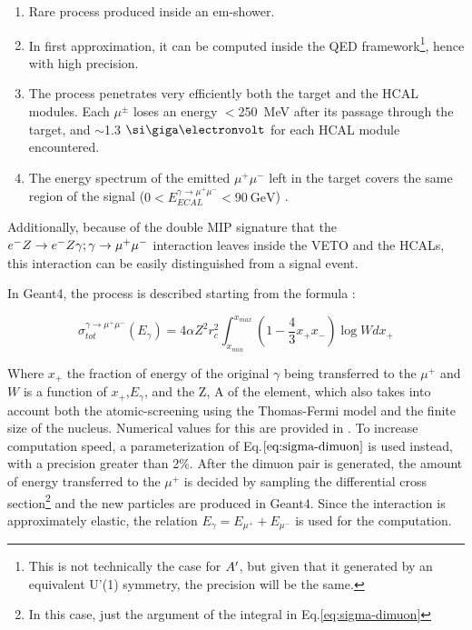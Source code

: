 \begin{enumerate}
\item Rare process produced inside an em-shower.
\item In first approximation, it can be computed inside the QED framework\footnote{This is not technically the case for $A'$, but given that it generated by an equivalent U'(1) symmetry, the precision will be the same.}, hence with high precision.
\item The process penetrates very efficiently both the target and the HCAL modules. Each $\mu^{\pm}$ loses an energy $<$\SI{250}{\mega\electronvolt} after its passage through the target, and $\sim$1.3 $\gev$ for each HCAL module encountered. 
\item The energy spectrum of the emitted $\mu^+\mu^-$ left in the target covers the same region of the signal ($0 < E_{ECAL}^{\gamma \to \mu^+ \mu^-} < \SI{90}{\giga\electronvolt}$) \cite{dimuon-mc}.
\end{enumerate}

Additionally, because of the double MIP signature that the $e^- Z \to e^- Z \gamma; \gamma \to \mu^+ \mu^-$ interaction leaves inside the VETO and the HCALs, this interaction can be easily distinguished from a signal event. 

In Geant4, the process is described starting from the formula \cite{dimuon-mc}:

\begin{equation}
  \label{eq:sigma-dimuon}
  \sigma_{tot}^{\gamma \to \mu^+ \mu^-}(E_{\gamma}) = 4\alpha Z^2 r^2_c\int^{x_{max}}_{x_{min}} \left(1 - \frac{4}{3}x_+x_- \right) \log{W}dx_+
\end{equation}

Where $x_+$ the fraction of energy of the original $\gamma$ being transferred to the $\mu^+$ and $W$ is a function of $x_+$,$E_{\gamma}$, and the Z, A of the element, which also takes into account both the atomic-screening using the Thomas-Fermi model and the finite size of the nucleus. Numerical values for this are provided in \cite{dimuon-mc}. To increase computation speed, a parameterization of Eq.$\ref{eq:sigma-dimuon}$ is used instead, with a precision greater than 2\%. After the dimuon pair is generated, the amount of energy transferred to the $\mu^+$ is decided by sampling the differential cross section\footnote{In this case, just the argument of the integral in Eq.\ref{eq:sigma-dimuon}} and the new particles are produced in Geant4. Since the interaction is approximately elastic, the relation $E_{\gamma} = E_{\mu^+} + E_{\mu^-}$ is used for the computation.

